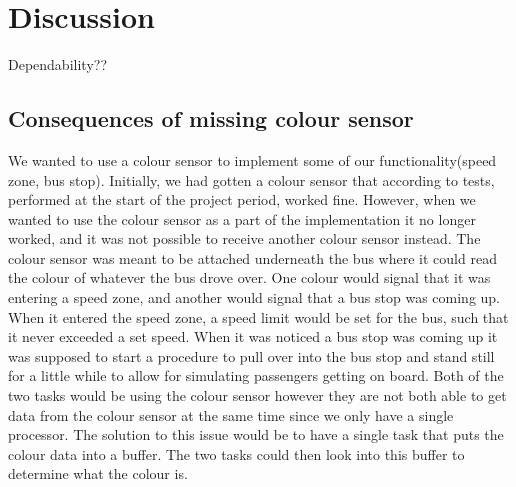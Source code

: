 \section{Discussion}


Dependability??


\subsection{Consequences of missing colour sensor}

We wanted to use a colour sensor to implement some of our functionality(speed zone, bus stop). Initially, we had gotten a colour sensor that according to tests, performed at the start of the project period, worked fine. However, when we wanted to use the colour sensor as a part of the implementation it no longer worked, and it was not possible to receive another colour sensor instead.
The colour sensor was meant to be attached underneath the bus where it could read the colour of whatever the bus drove over. One colour would signal that it was entering a speed zone, and another would signal that a bus stop was coming up. When it entered the speed zone, a speed limit would be set for the bus, such that it never exceeded a set speed. When it was noticed a bus stop was coming up it was supposed to start a procedure to pull over into the bus stop and stand still for a little while to allow for simulating passengers getting on board.
Both of the two tasks would be using the colour sensor however they are not both able to get data from the colour sensor at the same time since we only have a single processor. The solution to this issue would be to have a single task that puts the colour data into a buffer. The two tasks could then look into this buffer to determine what the colour is. 
